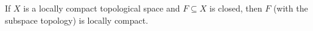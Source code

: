If $X$ is a locally compact topological space and $F \subseteq X$ is closed, then $F$ (with the subspace topology) is locally compact.
